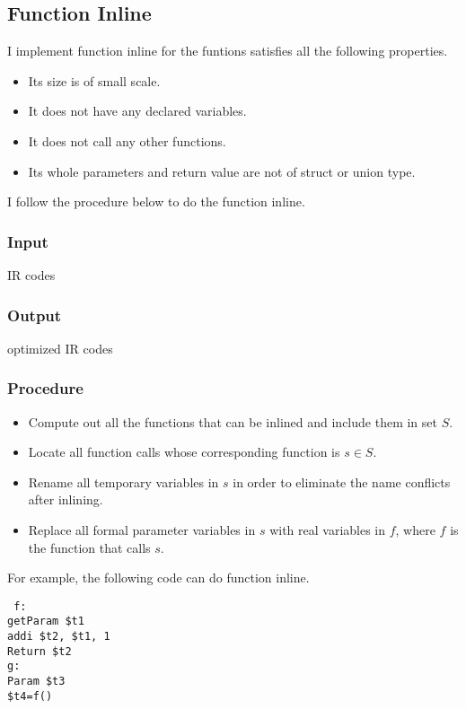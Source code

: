 \documentclass[journal]{IEEEtran}
\begin{document}
\subsection{Function Inline}

I implement function inline for the funtions satisfies all the following properties.
\begin{itemize}
\item Its size is of small scale.
\item It does not have any declared variables.
\item It does not call any other functions.
\item Its whole parameters and return value are not of struct or union type.
\end{itemize}

I follow the procedure below to do the function inline.

\subsubsection*{\textbf{Input}}
IR codes

\subsubsection*{\textbf{Output}}
optimized IR codes

\subsubsection*{\textbf{Procedure}}
\begin{itemize}
\item Compute out all the functions that can be inlined and include them in set $S$.
\item Locate all function calls whose corresponding function is $s\in S$.
\item Rename all temporary variables in $s$ in order to eliminate the name conflicts after inlining.
\item Replace all formal parameter variables in $s$ with real variables in $f$, where $f$ is the function that calls $s$.
\end{itemize}

For example, the following code can do function inline.
\begin{center}
\texttt{
f:  \ \  \ \ \ \  \ \ \ \  \ \ \  \  \ \ \ \ \ \ \\
getParam \$t1  \  \ \ \  \   \\
addi \$t2, \$t1, 1 \ \\
Return \$t2  \ \ \ \  \ \  \ \\
g:  \ \  \ \ \ \  \ \ \ \  \ \ \  \  \ \ \ \ \ \\
Param \$t3 \  \ \ \  \ \  \ \ \\
\$t4=f() \  \ \ \ \ \ \ \  \ \  \\\
}
\end{center}
\end{document}
